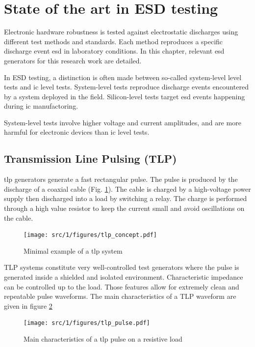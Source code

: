 \section{State of the art in ESD testing}
\label{sec:state-art-esd-testing}

Electronic hardware robustness is tested against electrostatic discharges using different test methods and standards.
Each method reproduces a specific discharge event \gls{esd} in laboratory conditions.
In this chapter, relevant \gls{esd} generators for this research work are detailed.

In ESD testing, a distinction is often made between so-called system-level level tests and \gls{ic} level tests.
System-level tests reproduce discharge events encountered by a system deployed in the field.
Silicon-level tests target \gls{esd} events happening during \gls{ic} manufactoring.

System-level tests involve higher voltage and current amplitudes, and are more harmful for electronic devices than \gls{ic} level tests.

\subsection{Transmission Line Pulsing (TLP)}

\gls{tlp} generators generate a fast rectangular pulse.
The pulse is produced by the discharge of a coaxial cable (Fig. \ref{tlp_concept}).
The cable is charged by a high-voltage power supply then discharged into a load by switching a relay.
The charge is performed through a high value resistor to keep the current small and avoid oscillations on the cable.

\begin{figure}[!h]
  \centering
  \texttt{[image: src/1/figures/tlp\_concept.pdf]}
  \caption{Minimal example of a \gls{tlp} system}
  \label{tlp_concept}
\end{figure}

TLP systems constitute very well-controlled test generators where the pulse is generated inside a shielded and isolated environment.
Characteristic impedance can be controlled up to the load.
Those features allow for extremely clean and repeatable pulse waveforms.
The main characteristics of a TLP waveform are given in figure \ref{tlp_pulse}

\begin{figure}[!h]
  \centering
  \texttt{[image: src/1/figures/tlp\_pulse.pdf]}
  \caption{Main characteristics of a \gls{tlp} pulse on a resistive load}
  \label{tlp_pulse}
\end{figure}

